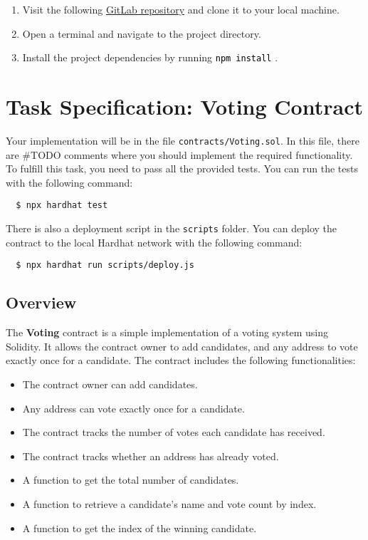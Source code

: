 \documentclass[12pt]{article}
\newcommand{\codegrey}[1]{%
  \texttt{\colorbox{black!4}{\textcolor{black}{#1}}}%
}
\begin{document}
\begin{enumerate}
    \item Visit the following \href{https://gitlab.fel.cvut.cz/radovluk/smart-contracts-exercises/-/tree/main/02-Decentralized-Voting-System/task/task-code?ref_type=heads}{GitLab repository} and clone it to your local machine.
    \item Open a terminal and navigate to the project directory.
    \item Install the project dependencies by running \codegrey{npm install}.
\end{enumerate}

\section{Task Specification: Voting Contract}

Your implementation will be in the file \texttt{contracts/Voting.sol}. In this file, there are \#TODO comments where you should implement the required functionality. To fulfill this task, you need to pass all the provided tests. You can run the tests with the following command:

\begin{verbatim}
  $ npx hardhat test
\end{verbatim}

There is also a deployment script in the \texttt{scripts} folder. You can deploy the contract to the local Hardhat network with the following command:

\begin{verbatim}
  $ npx hardhat run scripts/deploy.js
\end{verbatim}

\subsection{Overview}

The \textbf{Voting} contract is a simple implementation of a voting system using Solidity. It allows the contract owner to add candidates, and any address to vote exactly once for a candidate. The contract includes the following functionalities:
\begin{itemize}
    \item The contract owner can add candidates.
    \item Any address can vote exactly once for a candidate.
    \item The contract tracks the number of votes each candidate has received.
    \item The contract tracks whether an address has already voted.
    \item A function to get the total number of candidates.
    \item A function to retrieve a candidate's name and vote count by index.
    \item A function to get the index of the winning candidate.
\end{itemize}
\end{document}
